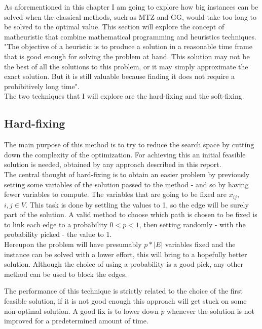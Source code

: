As aforementioned in this chapter I am going to explore how big instances can be solved when the classical methods, such as MTZ and GG, would take too long to be solved to the optimal value. This section will explore the concept of matheuristic that combine mathematical programming and heuristics techniques. "The objective of a heuristic is to produce a solution in a reasonable time frame that is good enough for solving the problem at hand. This solution may not be the best of all the solutions to this problem, or it may simply approximate the exact solution. But it is still valuable because finding it does not require a prohibitively long time"\cite{heuristic}.\\
The two techniques that I will explore are the hard-fixing and the soft-fixing.

\subsection{Hard-fixing}
\label{section:hard-fix}
The main purpose of this method is to try to reduce the search space by cutting down the complexity of the optimization. For achieving this an initial feasible solution is needed, obtained by any approach described in this report.\\
The central thought of hard-fixing is to obtain an easier problem by previously setting some variables of the solution passed to the method - and so by having fewer variables to compute. The variables that are going to be fixed are $x_{ij}$, $i, j\in V$. This task is done by settling the values to 1, so the edge will be surely part of the solution. A valid method to choose which path is chosen to be fixed is to link each edge to a probability $0<p<1$, then setting randomly - with the probability picked - the value to 1.\\
Hereupon the problem will have presumably $p*|E|$ variables fixed and the instance can be solved with a lower effort, this will bring to a hopefully better solution. Although the choice of using a probability is a good pick, any other method can be used to block the edges.

The performance of this technique is strictly related to the choice of the first feasible solution, if it is not good enough this approach will get stuck on some non-optimal solution. A good fix is to lower down $p$ whenever the solution is not improved for a predetermined amount of time.

